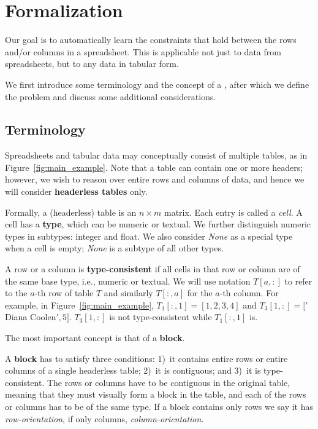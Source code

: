 \section{Formalization}\label{sec:formalization}
Our goal is to automatically learn the constraints that hold between the rows and/or columns in a spreadsheet. This is applicable not just to data from spreadsheets, but to any data in tabular form.


We first introduce some terminology and the concept of a \template, after which we define the problem and discuss some additional considerations.

\subsection{Terminology}
Spreadsheets and tabular data may conceptually consist of multiple tables, as in Figure~\ref{fig:main_example}.
Note that a table can contain one or more headers; however, we wish to reason over entire rows and columns of data, and hence we will consider \textbf{headerless tables} only.

Formally, a (headerless) table is an $n \times m$ matrix. Each entry is called a \textit{cell}.
A cell has a {\bf type}, which can be numeric or textual. We further distinguish numeric types in subtypes: integer and float. We also consider \textit{None} as a special type when a cell is empty; \textit{None} is a subtype of all other types.

A row or a column is \textbf{type-consistent} if all cells in that row or column are of the same base type, i.e., numeric or textual.
We will use notation $T[a,{:}]$ to refer to the $a$-th row of table $T$ and similarly $T[{:},a]$ for the $a$-th column.
For example, in Figure~\ref{fig:main_example}, $T_1[:,1] = [1,2,3,4]$ and $T_3[1,:] = ['$Diana Coolen$', 5]$.
$T_3[1, :]$ is not type-consistent while $T_1[:, 1]$ is.

The most important concept is that of a \textbf{block}. 
\begin{definition}
A \textbf{block} has to satisfy three conditions: 1)~it contains entire rows or entire columns of a single headerless table; 2)~it is contiguous; and 3)~it is type-consistent.
The rows or columns have to be contiguous in the original table, meaning that they must visually form a block in the table, and each of the rows or columns has to be of the same type. 
If a block contains only rows we say it has \textit{row-orientation}, if only columns, \textit{column-orientation}. 
\end{definition}

